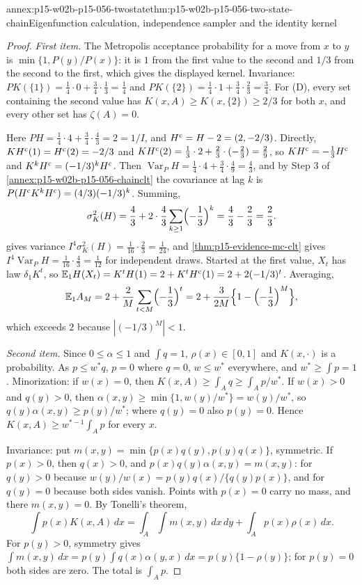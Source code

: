 \begin{annexitem}{annex:p15-w02b-p15-056-twostate}{thm:p15-w02b-p15-056-two-state-chain}{Eigenfunction calculation, independence sampler and the identity kernel}
\begin{proof}
\emph{First item.} The Metropolis acceptance probability for a move from
\(x\) to \(y\) is \(\min\{1,P(y)/P(x)\}\): it is \(1\) from the first value
to the second and \(1/3\) from the second to the first, which gives the
displayed kernel. Invariance: \(PK(\{1\})=\tfrac14\cdot0+\tfrac34\cdot\tfrac13=\tfrac14\)
and \(PK(\{2\})=\tfrac14\cdot1+\tfrac34\cdot\tfrac23=\tfrac34\). For (D),
every set containing the second value has \(K(x,A)\geq K(x,\{2\})\geq2/3\)
for both \(x\), and every other set has \(\zeta(A)=0\).

Here \(PH=\tfrac14\cdot4+\tfrac34\cdot\tfrac43=2=1/I\), and
\(H^{\rm c}=H-2=(2,-2/3)\). Directly,
\(KH^{\rm c}(1)=H^{\rm c}(2)=-2/3\) and
\(KH^{\rm c}(2)=\tfrac13\cdot2+\tfrac23\cdot(-\tfrac23)=\tfrac29\), so
\(KH^{\rm c}=-\tfrac13H^{\rm c}\) and \(K^kH^{\rm c}=(-1/3)^kH^{\rm c}\).
Then \(\operatorname{Var}_PH=\tfrac14\cdot4+\tfrac34\cdot\tfrac49=\tfrac43\),
and by Step 3 of \cref{annex:p15-w02b-p15-056-chainclt} the covariance at
lag \(k\) is \(P(H^{\rm c}K^kH^{\rm c})=(4/3)(-1/3)^k\). Summing,
\[
 \sigma^2_K(H)=\frac43+2\cdot\frac43\sum_{k\geq1}\Bigl(-\frac13\Bigr)^k
 =\frac43-\frac23=\frac23 .
\]
 gives variance
\(I^4\sigma^2_K(H)=\tfrac1{16}\cdot\tfrac23=\tfrac1{24}\), and
\cref{thm:p15-evidence-mc-clt} gives
\(I^4\operatorname{Var}_PH=\tfrac1{16}\cdot\tfrac43=\tfrac1{12}\) for
independent draws. Started at the first value, \(X_t\) has law
\(\delta_1K^t\), so
\(\mathbb E_1H(X_t)=K^tH(1)=2+K^tH^{\rm c}(1)=2+2(-1/3)^t\). Averaging,
\[
 \mathbb E_1A_M=2+\frac2M\sum_{t<M}\Bigl(-\frac13\Bigr)^t
 =2+\frac3{2M}\Bigl\{1-\Bigl(-\frac13\Bigr)^M\Bigr\},
\]
which exceeds \(2\) because \(|(-1/3)^M|<1\).

\emph{Second item.} Since \(0\leq\alpha\leq1\) and \(\int q=1\),
\(\rho(x)\in[0,1]\) and \(K(x,\cdot)\) is a probability. As
\(p\leq w^*q\), \(p=0\) where \(q=0\), \(w\leq w^*\) everywhere, and
\(w^*\geq\int p=1\). Minorization: if \(w(x)=0\), then
\(K(x,A)\geq\int_Aq\geq\int_Ap/w^*\). If \(w(x)>0\) and \(q(y)>0\), then
\(\alpha(x,y)\geq\min\{1,w(y)/w^*\}=w(y)/w^*\), so
\(q(y)\alpha(x,y)\geq p(y)/w^*\); where \(q(y)=0\) also \(p(y)=0\). Hence
\(K(x,A)\geq w^{*-1}\int_Ap\) for every \(x\).

Invariance: put \(m(x,y)=\min\{p(x)q(y),p(y)q(x)\}\), symmetric. If
\(p(x)>0\), then \(q(x)>0\), and \(p(x)q(y)\alpha(x,y)=m(x,y)\): for
\(q(y)>0\) because \(w(y)/w(x)=p(y)q(x)/\{q(y)p(x)\}\), and for \(q(y)=0\)
because both sides vanish. Points with \(p(x)=0\) carry no mass, and there
\(m(x,y)=0\). By Tonelli's theorem,
\[
 \int p(x)K(x,A)\,dx=\int_A\int m(x,y)\,dx\,dy+\int_Ap(x)\rho(x)\,dx .
\]
For \(p(y)>0\), symmetry gives
\(\int m(x,y)\,dx=p(y)\int q(x)\alpha(y,x)\,dx=p(y)\{1-\rho(y)\}\); for
\(p(y)=0\) both sides are zero. The total is \(\int_Ap\).


\end{proof}
\end{annexitem}
